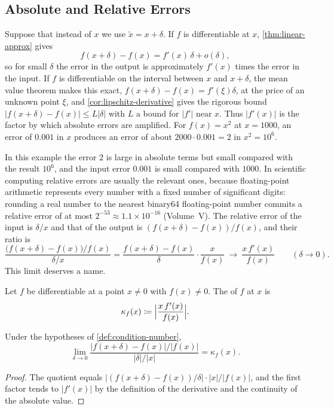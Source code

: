 \subsection{Absolute and Relative Errors}

Suppose that instead of $x$ we use $\tilde x=x+\delta$. If $f$ is differentiable at $x$, \cref{thm:linear-approx} gives
\[
f(x+\delta)-f(x)=f'(x)\,\delta+o(\delta),
\]
so for small $\delta$ the error in the output is approximately $f'(x)$ times the error in the input. If $f$ is differentiable on the interval between $x$ and $x+\delta$, the mean value theorem makes this exact, $f(x+\delta)-f(x)=f'(\xi)\delta$, at the price of an unknown point $\xi$, and \cref{cor:lipschitz-derivative} gives the rigorous bound $|f(x+\delta)-f(x)|\le L|\delta|$ with $L$ a bound for $|f'|$ near $x$. Thus $|f'(x)|$ is the factor by which absolute errors are amplified. For $f(x)=x^2$ at $x=1000$, an error of $0.001$ in $x$ produces an error of about $2000\cdot0.001=2$ in $x^2=10^6$.

In this example the error $2$ is large in absolute terms but small compared with the result $10^6$, and the input error $0.001$ is small compared with $1000$. In scientific computing relative errors are usually the relevant ones, because floating-point arithmetic represents every number with a fixed number of significant digits: rounding a real number to the nearest binary64 floating-point number commits a relative error of at most $2^{-53}\approx1.1\times10^{-16}$ (Volume~V). The relative error of the input is $\delta/x$ and that of the output is $(f(x+\delta)-f(x))/f(x)$, and their ratio is
\[
\frac{\bigl(f(x+\delta)-f(x)\bigr)/f(x)}{\delta/x}=\frac{f(x+\delta)-f(x)}{\delta}\cdot\frac x{f(x)}\ \longrightarrow\ \frac{x\,f'(x)}{f(x)}\qquad(\delta\to0).
\]
This limit deserves a name.

\begin{definition}
\label{def:condition-number}
Let $f$ be differentiable at a point $x\ne0$ with $f(x)\ne0$. The  of $f$ at $x$ is
\[
\kappa_f(x)\coloneqq\Bigl|\frac{x\,f'(x)}{f(x)}\Bigr| .
\]
\end{definition}

\begin{proposition}
\label{prop:condition-number}
Under the hypotheses of \cref{def:condition-number},
\[
\lim_{\delta\to0}\frac{|f(x+\delta)-f(x)|/|f(x)|}{|\delta|/|x|}=\kappa_f(x).
\]
\end{proposition}

\begin{proof}
The quotient equals $\bigl|(f(x+\delta)-f(x))/\delta\bigr|\cdot|x|/|f(x)|$, and the first factor tends to $|f'(x)|$ by the definition of the derivative and the continuity of the absolute value.
\end{proof}

